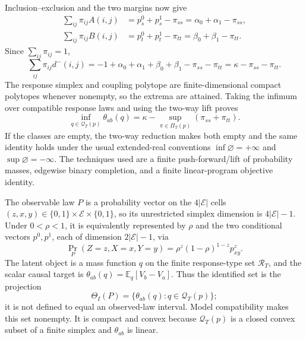 Inclusion--exclusion and the two margins now give
\[
\begin{aligned}
 \sum_{ij}\pi_{ij}A(i,j)
 &=p_s^0+p_s^1-\pi_{ss}=\alpha_0+\alpha_1-\pi_{ss},\\
 \sum_{ij}\pi_{ij}B(i,j)
 &=p_t^0+p_t^1-\pi_{tt}=\beta_0+\beta_1-\pi_{tt}.
\end{aligned}
\]
Since \(\sum_{ij}\pi_{ij}=1\),
\[
 \sum_{ij}\pi_{ij}d^-(i,j)
 =-1+\alpha_0+\alpha_1+\beta_0+\beta_1-\pi_{ss}-\pi_{tt}
 =\kappa-\pi_{ss}-\pi_{tt}.
\]
The response simplex and coupling polytope are finite-dimensional compact
polytopes whenever nonempty, so the extrema are attained.  Taking the
infimum over compatible response laws and using the two-way lift proves
\[
 \inf_{q\in\mathcal Q_T(p)}\theta_{ab}(q)
 =\kappa-\sup_{\pi\in\Pi_T(p)}(\pi_{ss}+\pi_{tt}).
\]
If the classes are empty, the two-way reduction makes both empty and the
same identity holds under the usual extended-real conventions
\(\inf\varnothing=+\infty\) and \(\sup\varnothing=-\infty\).
The techniques used are a finite push-forward/lift of probability masses,
edgewise binary completion, and a finite linear-program objective identity.

The observable law \(P\) is a probability vector on the
\(4|\mathcal E|\) cells \((z,x,y)\in\{0,1\}\times\mathcal E\times\{0,1\}\),
so its unrestricted simplex dimension is \(4|\mathcal E|-1\).  Under
\(0<\rho<1\), it is equivalently represented by \(\rho\) and the two
conditional vectors \(p^0,p^1\), each of dimension \(2|\mathcal E|-1\), via
\[
 \Pr_P(Z=z,X=x,Y=y)=\rho^z(1-\rho)^{1-z}p^z_{xy}.
\]
The latent object is a mass function \(q\) on the finite response-type set
\(\mathcal R_T\), and the scalar causal target is
\(\theta_{ab}(q)=\mathbb E_q[V_b-V_a]\).  Thus the identified set is the
projection
\[
 \Theta_I(P)=\{\theta_{ab}(q):q\in\mathcal Q_T(p)\};
\]
it is not defined to equal an observed-law interval.  Model compatibility
makes this set nonempty.  It is compact and convex because
\(\mathcal Q_T(p)\) is a closed convex subset of a finite simplex and
\(\theta_{ab}\) is linear.

